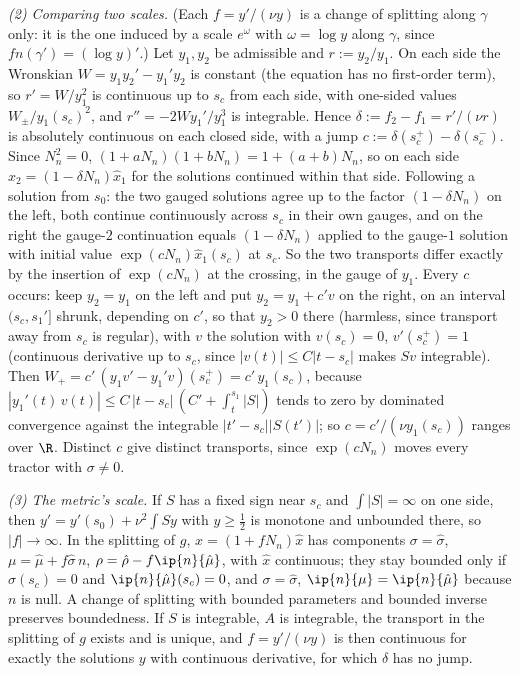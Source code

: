 \emph{(2) Comparing two scales.} (Each $f = y'/(\nu y)$ is a change of splitting along $\gamma$ only: it is the one induced by a scale $e^{\omega}$ with $\omega = \log y$ along $\gamma$, since $f n(\gamma') = (\log y)'$.) Let $y_1, y_2$ be admissible and $r := y_2/y_1$. On each side the Wronskian $W = y_1 y_2' - y_1' y_2$ is constant (the equation has no first-order term), so $r' = W/y_1^2$ is continuous up to $s_c$ from each side, with one-sided values $W_\pm/y_1(s_c)^2$, and $r'' = -2Wy_1'/y_1^3$ is integrable. Hence $\delta := f_2 - f_1 = r'/(\nu r)$ is absolutely continuous on each closed side, with a jump $c := \delta(s_c^+) - \delta(s_c^-)$. Since $N_n^2 = 0$, $(1 + aN_n)(1 + bN_n) = 1 + (a + b)N_n$, so on each side $\hat x_2 = (1 - \delta N_n)\hat x_1$ for the solutions continued within that side. Following a solution from $s_0$: the two gauged solutions agree up to the factor $(1 - \delta N_n)$ on the left, both continue continuously across $s_c$ in their own gauges, and on the right the gauge-$2$ continuation equals $(1 - \delta N_n)$ applied to the gauge-$1$ solution with initial value $\exp(c N_n)\hat x_1(s_c)$ at $s_c$. So the two transports differ exactly by the insertion of $\exp(cN_n)$ at the crossing, in the gauge of $y_1$. Every $c$ occurs: keep $y_2 = y_1$ on the left and put $y_2 = y_1 + c'v$ on the right, on an interval $(s_c, s_1']$ shrunk, depending on $c'$, so that $y_2 > 0$ there (harmless, since transport away from $s_c$ is regular), with $v$ the solution with $v(s_c) = 0$, $v'(s_c^+) = 1$ (continuous derivative up to $s_c$, since $|v(t)| \le C|t - s_c|$ makes $Sv$ integrable). Then $W_+ = c'\,(y_1 v' - y_1' v)(s_c^+) = c'\,y_1(s_c)$, because $|y_1'(t)\,v(t)| \le C\,|t - s_c|\,(C' + \int_t^{s_1}|S|)$ tends to zero by dominated convergence against the integrable $|t' - s_c||S(t')|$; so $c = c'/(\nu y_1(s_c))$ ranges over $\R$. Distinct $c$ give distinct transports, since $\exp(cN_n)$ moves every tractor with $\sigma \neq 0$.

\emph{(3) The metric's scale.} If $S$ has a fixed sign near $s_c$ and $\int|S| = \infty$ on one side, then $y' = y'(s_0) + \nu^2\int S y$ with $y \ge \tfrac12$ is monotone and unbounded there, so $|f| \to \infty$. In the splitting of $g$, $x = (1 + fN_n)\hat x$ has components $\sigma = \hat\sigma$, $\mu = \hat\mu + f\hat\sigma\, n$, $\rho = \hat\rho - f\ip{n}{\hat\mu}$, with $\hat x$ continuous; they stay bounded only if $\hat\sigma(s_c) = 0$ and $\ip{n}{\hat\mu}(s_c) = 0$, and $\sigma = \hat\sigma$, $\ip{n}{\mu} = \ip{n}{\hat\mu}$ because $n$ is null. A change of splitting with bounded parameters and bounded inverse preserves boundedness. If $S$ is integrable, $A$ is integrable, the transport in the splitting of $g$ exists and is unique, and $f = y'/(\nu y)$ is then continuous for exactly the solutions $y$ with continuous derivative, for which $\delta$ has no jump.

